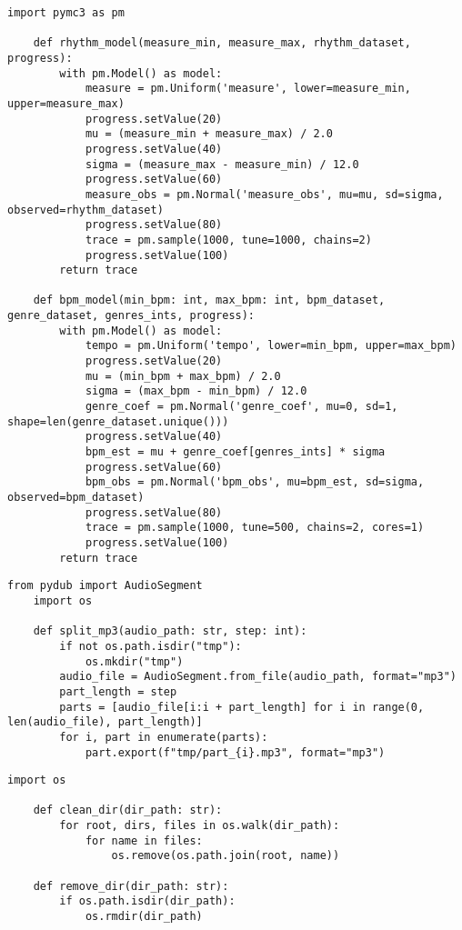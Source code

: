 \clearpage


\begin{lstlisting}[caption={байесовские модели}]
	import pymc3 as pm

	def rhythm_model(measure_min, measure_max, rhythm_dataset, progress):
		with pm.Model() as model:
			measure = pm.Uniform('measure', lower=measure_min, upper=measure_max)
			progress.setValue(20)
			mu = (measure_min + measure_max) / 2.0
			progress.setValue(40)
			sigma = (measure_max - measure_min) / 12.0
			progress.setValue(60)
			measure_obs = pm.Normal('measure_obs', mu=mu, sd=sigma, observed=rhythm_dataset)
			progress.setValue(80)
			trace = pm.sample(1000, tune=1000, chains=2)
			progress.setValue(100)
		return trace

	def bpm_model(min_bpm: int, max_bpm: int, bpm_dataset, genre_dataset, genres_ints, progress):
		with pm.Model() as model:
			tempo = pm.Uniform('tempo', lower=min_bpm, upper=max_bpm)
			progress.setValue(20)
			mu = (min_bpm + max_bpm) / 2.0
			sigma = (max_bpm - min_bpm) / 12.0
			genre_coef = pm.Normal('genre_coef', mu=0, sd=1, shape=len(genre_dataset.unique()))
			progress.setValue(40)
			bpm_est = mu + genre_coef[genres_ints] * sigma
			progress.setValue(60)
			bpm_obs = pm.Normal('bpm_obs', mu=bpm_est, sd=sigma, observed=bpm_dataset)
			progress.setValue(80)
			trace = pm.sample(1000, tune=500, chains=2, cores=1)
			progress.setValue(100)
		return trace
\end{lstlisting}

\clearpage


\begin{lstlisting}[caption={разделение аудиофайла}]
	from pydub import AudioSegment
	import os
	
	def split_mp3(audio_path: str, step: int):
		if not os.path.isdir("tmp"):
			os.mkdir("tmp")
		audio_file = AudioSegment.from_file(audio_path, format="mp3")
		part_length = step
		parts = [audio_file[i:i + part_length] for i in range(0, len(audio_file), part_length)]
		for i, part in enumerate(parts):
			part.export(f"tmp/part_{i}.mp3", format="mp3")
\end{lstlisting}

\begin{lstlisting}[caption={очистка временных директорий}]
	import os
	
	def clean_dir(dir_path: str):
		for root, dirs, files in os.walk(dir_path):
			for name in files:
				os.remove(os.path.join(root, name))
	
	def remove_dir(dir_path: str):
		if os.path.isdir(dir_path):
			os.rmdir(dir_path)
\end{lstlisting}
